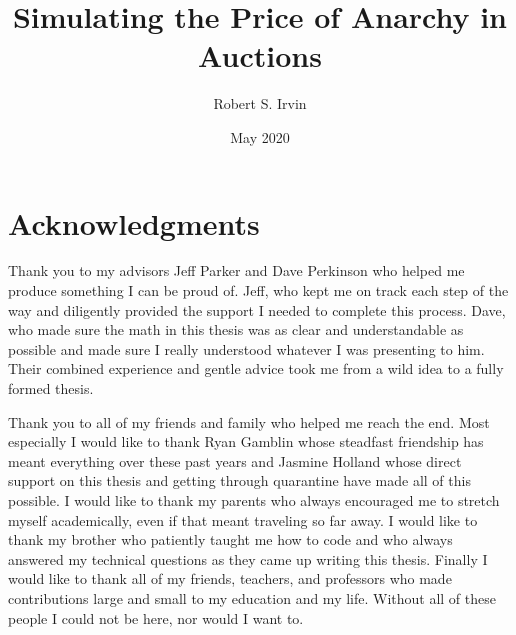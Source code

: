 \documentclass[12pt,twoside]{reedthesis}
\title{Simulating the Price of Anarchy in Auctions}
\author{Robert S. Irvin}
\date{May 2020}
\begin{document}
  \maketitle
  \frontmatter %
  \pagestyle{empty} %

    \chapter*{Acknowledgments}
    
    Thank you to my advisors Jeff Parker and Dave Perkinson who helped me produce something I can be proud of. Jeff, who kept me on track each step of the way and diligently provided the support I needed to complete this process. Dave, who made sure the math in this thesis was as clear and understandable as possible and made sure I really understood whatever I was presenting to him. Their combined experience and gentle advice took me from a wild idea to a fully formed thesis.
    
	Thank you to all of my friends and family who helped me reach the end. Most especially I would like to thank Ryan Gamblin whose steadfast friendship has meant everything over these past years and Jasmine Holland whose direct support on this thesis and getting through quarantine have made all of this possible. I would like to thank my parents who always encouraged me to stretch myself academically, even if that meant traveling so far away. I would like to thank my brother who patiently taught me how to code and who always answered my technical questions as they came up writing this thesis. Finally I would like to thank all of my friends, teachers, and professors who made contributions large and small to my education and my life. Without all of these people I could not be here, nor would I want to.

	
\end{document}
